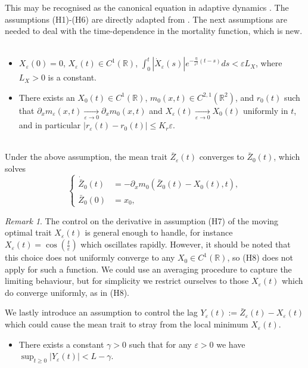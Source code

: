 \documentclass[]{article}
\theoremstyle{remark}
\newtheorem{remark}{Remark}
\begin{document}
This may be recognised as the canonical equation in adaptive dynamics \cite{champagnat2002canonical}. The assumptions (H1)-(H6) are directly adapted from \cite{GHM}. The next assumptions are needed to deal with the time-dependence in the mortality function, which is new.
\ \\
\begin{itemize}
    \item[(H7)] $X_{\varepsilon}(0)=0$, $X_\varepsilon(t)\in{}C^{1}(\mathbb{R})$, $\int_{0}^{t}|\dot{X}_\varepsilon(s)|e^{-\frac{\eta}{\varepsilon^2}(t-s)}ds<\varepsilon{}L_X$, where  $L_X>0$ is a constant.
    \item[(H8)] There exists an $X_0(t)\in{}C^{1}(\mathbb{R})$, $m_0(x,t)\in{}C^{2,1}(\mathbb{R}^2)$, and $r_0(t)$ such that $\partial_{x}m_\varepsilon(x,t)\xrightarrow[\varepsilon\rightarrow{0}]{}\partial_{x}m_0(x,t)$ and $X_\varepsilon(t)\xrightarrow[\varepsilon\rightarrow{0}]{}X_0(t)$ uniformly in $t$, and in particular $|r_\varepsilon(t)-r_0(t)|\leq{}K_r\varepsilon.$
\end{itemize}
\ \\
Under the above assumption, the mean trait $\bar{Z}_\varepsilon(t)$ converges to $\bar{Z}_0(t)$, which solves
\begin{equation}
\label{eqn:limiting_problem}
\left\{
\begin{aligned}
\dot{\bar{Z}}_0(t) &= -  \partial_{x}m_0(\bar{Z}_0(t)-X_0(t),t), \\
\bar{Z}_0(0) & = x_0,  
\end{aligned}
\right.
\end{equation}

 
\begin{remark}
The control on the derivative in assumption (H7) of the moving optimal trait $X_\varepsilon(t)$ is general enough to handle, for instance $X_\varepsilon(t)=\cos\left(\frac{t}{\varepsilon}\right)$ which oscillates rapidly. However, it should be noted that this choice does not uniformly converge to any $X_0\in{}C^{1}(\mathbb{R})$, so (H8) does not apply for such a function. We could use an averaging procedure to capture the limiting behaviour, but for simplicity we restrict ourselves to those $X_\varepsilon(t)$ which do converge uniformly, as in (H8).
\end{remark}
We lastly introduce an assumption  to control the lag ${Y}_\varepsilon(t):=\bar{Z}_\varepsilon(t)-X_\varepsilon(t)$  which could cause the mean trait to stray from the local minimum $X_\varepsilon(t)$. 
 \ \\
 \begin{itemize}
     \item[(H9)] There exists a constant $\gamma>0$ such that for any $\varepsilon>0$ we have $\sup_{t\geq{0}}|Y_\varepsilon(t)|<L-\gamma$.
 \end{itemize}
 
\end{document}
